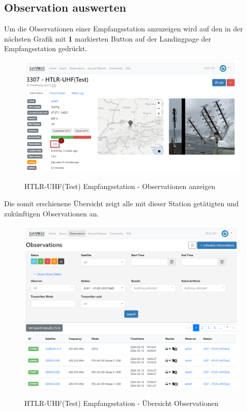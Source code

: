 \subsection{Observation auswerten}
Um die Observationen einer Empfangsstation anzuzeigen wird auf den in der nächsten Grafik mit \textbf{1} markierten Button auf der Landingpage der Empfangsstation gedrückt.

\begin{figure} [H]
	\centering
	\includegraphics[width=\linewidth]{../ref/show_observation.png}
	\caption{HTLR-UHF(Test) Empfangsstation - Observationen anzeigen} \cite{noauthor_satnogs_nodate}
	\label{fig:htrl-uhf(test)showobservations}
\end{figure}

Die somit erschienene Übersicht zeigt alle mit dieser Station getätigten und zukünftigen Observationen an.

\begin{figure} [H]
	\centering
	\includegraphics[width=.75\linewidth]{../ref/overview_observations.png}
	\caption{HTLR-UHF(Test) Empfangsstation - Übersicht Observationen} \cite{noauthor_satnogs_nodate}
	\label{fig:htrl-uhf(test)overviewobservations}
\end{figure}

